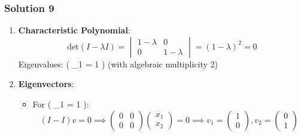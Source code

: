 \documentclass[
  letterpaper,
  DIV=11,
  numbers=noendperiod]{scrartcl}
\providecommand{\tightlist}{%
  \setlength{\itemsep}{0pt}\setlength{\parskip}{0pt}}\usepackage{longtable,booktabs,array}
\begin{document}
\subsubsection{Solution 9}\label{solution-9}

\begin{enumerate}
\def\labelenumi{\arabic{enumi}.}
\item
  \textbf{Characteristic Polynomial}: \[
  \text{det}(I - \lambda I) = \begin{vmatrix} 1 - \lambda & 0 \\ 0 & 1 - \lambda \end{vmatrix} = (1 - \lambda)^2 = 0
  \] Eigenvalues: ( \lambda\_1 = 1 ) (with algebraic multiplicity 2)
\item
  \textbf{Eigenvectors}:

  \begin{itemize}
  \tightlist
  \item
    For ( \lambda\_1 = 1 ): \[
    (I - I)v = 0 \implies \begin{pmatrix} 0 & 0 \\ 0 & 0 \end{pmatrix}\begin{pmatrix} x_1 \\ x_2 \end{pmatrix} = 0 \implies v_1 = \begin{pmatrix} 1 \\ 0 \end{pmatrix}, v_2 = \begin{pmatrix} 0 \\ 1 \end{pmatrix}
    \]
  \end{itemize}
\end{enumerate}
\end{document}
